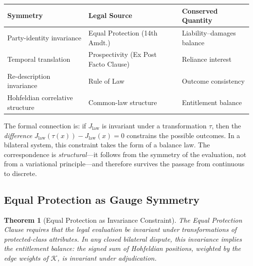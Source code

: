 \documentclass[12pt]{article}
\newtheorem{theorem}{Theorem}[section]
\theoremstyle{definition}
\theoremstyle{remark}
\begin{document}
\begin{center}
\begin{tabular}{lll}
\toprule
\textbf{Symmetry} & \textbf{Legal Source} & \textbf{Conserved Quantity} \\
\midrule
Party-identity invariance & Equal Protection (14th Amdt.) & Liability--damages balance \\
Temporal translation & Prospectivity (Ex Post Facto Clause) & Reliance interest \\
Re-description invariance & Rule of Law & Outcome consistency \\
Hohfeldian correlative structure & Common-law structure & Entitlement balance \\
\bottomrule
\end{tabular}
\end{center}

The formal connection is: if $J_{\text{law}}$ is invariant under a transformation $\tau$, then the \emph{difference} $J_{\text{law}}(\tau(x)) - J_{\text{law}}(x) = 0$ constrains the possible outcomes.  In a bilateral system, this constraint takes the form of a balance law.  The correspondence is \emph{structural}---it follows from the symmetry of the evaluation, not from a variational principle---and therefore survives the passage from continuous to discrete.

\subsection{Equal Protection as Gauge Symmetry}

\begin{theorem}[Equal Protection as Invariance Constraint]
\label{thm:equal_protection}
The Equal Protection Clause requires that the legal evaluation be invariant under transformations of protected-class attributes.  In any closed bilateral dispute, this invariance implies the \emph{entitlement balance}: the signed sum of Hohfeldian positions, weighted by the edge weights of $\mathcal{K}$, is invariant under adjudication.
\end{theorem}
\end{document}
